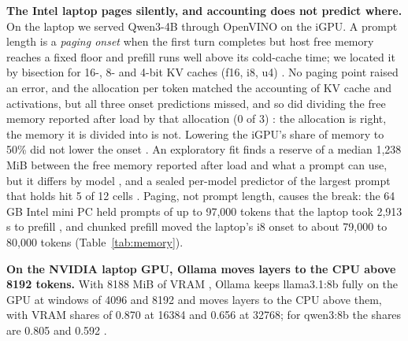 \documentclass[conference,10pt]{IEEEtran}
\begin{document}
\textbf{The Intel laptop pages silently, and accounting does not predict where.} On the laptop we served Qwen3-4B through OpenVINO on the iGPU. A prompt length is a \emph{paging onset} when the first turn completes but host free memory reaches a fixed floor and prefill runs well above its cold-cache time; we located it by bisection for 16-, 8- and 4-bit KV caches (f16, i8, u4)%
. No paging point raised an error, and the allocation per token matched the accounting of KV cache and activations, but all three onset predictions missed, and so did dividing the free memory reported after load by that allocation (0 of 3)%
: the allocation is right, the memory it is divided into is not. Lowering the iGPU's share of memory to 50\% did not lower the onset%
. An exploratory fit finds a reserve of a median 1,238 MiB between the free memory reported after load and what a prompt can use, but it differs by model%
, and a sealed per-model predictor of the largest prompt that holds hit 5 of 12 cells%
. Paging, not prompt length, causes the break: the 64 GB Intel mini PC held prompts of up to 97,000 tokens that the laptop took 2,913 s to prefill%
, and chunked prefill moved the laptop's i8 onset to about 79,000 to 80,000 tokens %
(Table~\ref{tab:memory}).

\textbf{On the NVIDIA laptop GPU, Ollama moves layers to the CPU above 8192 tokens.} With 8188 MiB of VRAM%
, Ollama keeps llama3.1:8b fully on the GPU at windows of 4096 and 8192 and moves layers to the CPU above them, with VRAM shares of 0.870 at 16384 and 0.656 at 32768; for qwen3:8b the shares are 0.805 and 0.592%
.
\end{document}
